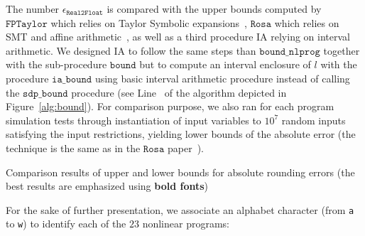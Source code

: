 \documentclass[preprint,fleqn,nocopyrightspace]{sigplanconf}
\newcommand{\code}[1]{\lstinline{#1}}
\newcommand{\nbenchs}{23}
\newcommand{\iabound}{\mathtt{ia\_bound}}
\newcommand{\sdpbound}{\mathtt{sdp\_bound}}
\newcommand{\bound}{\mathtt{bound}}
\newcommand{\boundnlprog}{\mathtt{bound\_nlprog}}
\newcommand{\realtofloat}{\mathtt{Real2Float}}
\newcommand{\rosa}{\mathtt{Rosa}}
\newcommand{\fptaylor}{\mathtt{FPTaylor}}
\theoremstyle{plain}
\begin{document}
The number $\epsilon_{\realtofloat}$ is compared with the upper bounds computed by $\fptaylor$ which relies on Taylor Symbolic expansions~\cite{fptaylor15}, $\rosa$ which relies on SMT and affine arithmetic~\cite{Darulova14Popl}, as well as a third procedure IA relying on interval arithmetic. We designed IA to follow the same steps than $\boundnlprog$ together with the sub-procedure $\bound$ but to compute an interval enclosure of $l$ with the procedure $\iabound$ using basic interval arithmetic procedure  instead of calling the $\sdpbound$ procedure (see Line~ of the algorithm depicted in Figure~\ref{alg:bound}). For comparison purpose, we also ran for each program simulation tests through instantiation of input variables to $10^7$ random inputs satisfying the input restrictions, yielding lower bounds of the absolute error (the technique is the same as in the $\rosa$ paper~\cite{Darulova14Popl}).
%
\begin{table*}[!ht]
\begin{center}
\caption{Comparison results of upper and lower bounds for absolute rounding errors (the best results are emphasized using \textbf{bold fonts})}

\label{table:error}
\end{center}
\end{table*}
%
For the sake of further presentation, we associate an alphabet character (from \code{a} to \code{w}) to identify each of the $\nbenchs$ nonlinear programs:
%
\end{document}
